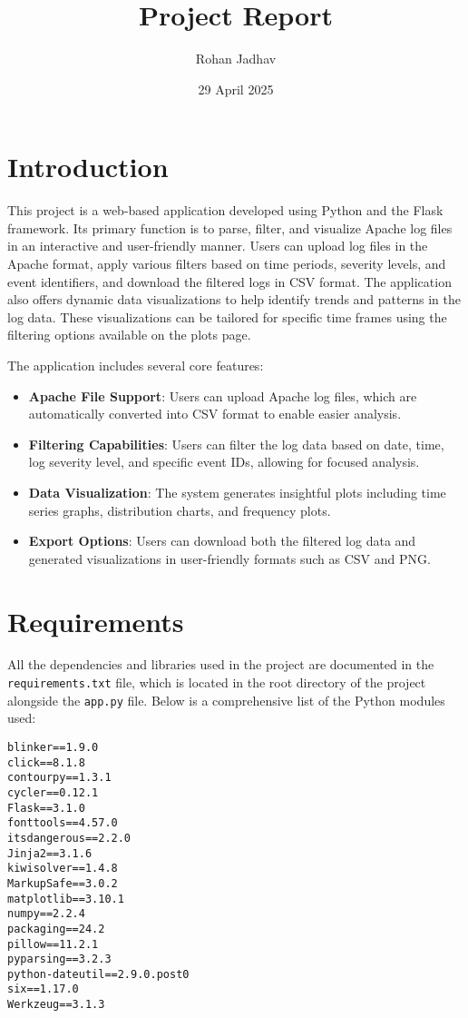 \documentclass{article}
\title{Project Report}
\author{Rohan Jadhav}
\date{29 April 2025}
\begin{document}
\maketitle

\section{Introduction}
This project is a web-based application developed using Python and the Flask framework. Its primary function is to parse, filter, and visualize Apache log files in an interactive and user-friendly manner. Users can upload log files in the Apache format, apply various filters based on time periods, severity levels, and event identifiers, and download the filtered logs in CSV format. The application also offers dynamic data visualizations to help identify trends and patterns in the log data. These visualizations can be tailored for specific time frames using the filtering options available on the plots page.

The application includes several core features:
\begin{itemize}
    \item \textbf{Apache File Support}: Users can upload Apache log files, which are automatically converted into CSV format to enable easier analysis.
    \item \textbf{Filtering Capabilities}: Users can filter the log data based on date, time, log severity level, and specific event IDs, allowing for focused analysis.
    \item \textbf{Data Visualization}: The system generates insightful plots including time series graphs, distribution charts, and frequency plots.
    \item \textbf{Export Options}: Users can download both the filtered log data and generated visualizations in user-friendly formats such as CSV and PNG.
\end{itemize}

\section{Requirements}
All the dependencies and libraries used in the project are documented in the \texttt{requirements.txt} file, which is located in the root directory of the project alongside the \texttt{app.py} file. Below is a comprehensive list of the Python modules used:

\begin{verbatim}
blinker==1.9.0
click==8.1.8
contourpy==1.3.1
cycler==0.12.1
Flask==3.1.0
fonttools==4.57.0
itsdangerous==2.2.0
Jinja2==3.1.6
kiwisolver==1.4.8
MarkupSafe==3.0.2
matplotlib==3.10.1
numpy==2.2.4
packaging==24.2
pillow==11.2.1
pyparsing==3.2.3
python-dateutil==2.9.0.post0
six==1.17.0
Werkzeug==3.1.3
\end{verbatim}
\end{document}
